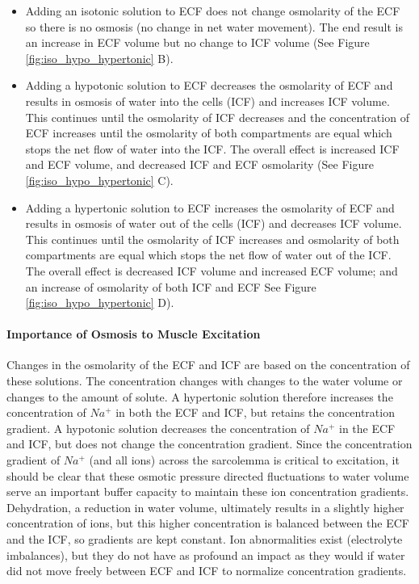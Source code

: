 \begin{itemize}
    \item Adding an isotonic solution to ECF does not change osmolarity of the ECF so there is no osmosis (no change in net water movement). The end result is an increase in ECF volume but no change to ICF volume (See Figure \ref{fig:iso_hypo_hypertonic} B).
    \item Adding a hypotonic solution to ECF decreases the osmolarity of ECF and results in osmosis of water into the cells (ICF) and increases ICF volume. This continues until the osmolarity of ICF decreases and the concentration of ECF increases until the osmolarity of both compartments are equal which stops the net flow of water into the ICF. The overall effect is increased ICF and ECF volume, and decreased ICF and ECF osmolarity (See Figure \ref{fig:iso_hypo_hypertonic} C). 
    \item Adding a hypertonic solution to ECF increases the osmolarity of ECF and results in osmosis of water out of the cells (ICF) and decreases ICF volume. This continues until the osmolarity of ICF increases and osmolarity of both compartments are equal which stops the net flow of water out of the ICF. The overall effect is decreased ICF volume and increased ECF volume; and an increase of osmolarity of both ICF and ECF See Figure \ref{fig:iso_hypo_hypertonic} D).
\end{itemize}

\paragraph{Importance of Osmosis to Muscle Excitation}

Changes in the osmolarity of the ECF and ICF are based on the concentration of these solutions. The concentration changes with changes to the water volume or changes to the amount of solute. A hypertonic solution therefore increases the concentration of $Na^+$ in both the ECF and ICF, but retains the concentration gradient. A hypotonic solution decreases the concentration of $Na^+$ in the ECF and ICF, but does not change the concentration gradient. Since the concentration gradient of $Na^+$ (and all ions) across the sarcolemma is critical to excitation, it should be clear that these osmotic pressure directed fluctuations to water volume serve an important buffer capacity to maintain these ion concentration gradients. Dehydration, a reduction in water volume, ultimately results in a slightly higher concentration of ions, but this higher concentration is balanced between the ECF and the ICF, so gradients are kept constant.
Ion abnormalities exist (electrolyte imbalances), but they do not have as profound an impact as they would if water did not move freely between ECF and ICF to normalize concentration gradients. 

